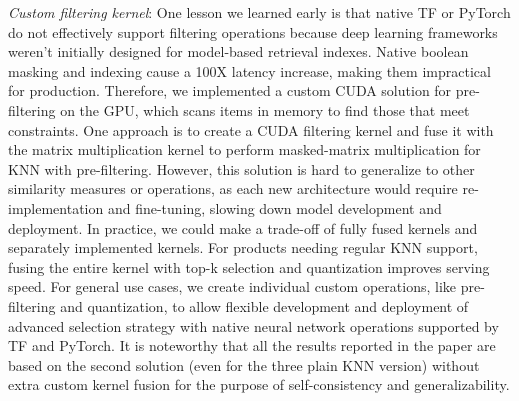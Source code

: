 \textit{Custom filtering kernel}: One lesson we learned early is that native TF or PyTorch do not effectively support filtering operations because deep learning frameworks weren't initially designed for model-based retrieval indexes. Native boolean masking and indexing cause a 100X latency increase, making them impractical for production. Therefore, we implemented a custom CUDA solution for pre-filtering on the GPU, which scans items in memory to find those that meet constraints. One approach is to create a CUDA filtering kernel and fuse it with the matrix multiplication kernel to perform masked-matrix multiplication for KNN with pre-filtering. However, this solution is hard to generalize to other similarity measures or operations, as each new architecture would require re-implementation and fine-tuning, slowing down model development and deployment. 
In practice, we could make a trade-off of fully fused kernels and separately implemented kernels. For products needing regular KNN support, fusing the entire kernel with top-k selection and quantization improves serving speed. For general use cases, we create individual custom operations, like pre-filtering and quantization, to allow flexible development and deployment of advanced selection strategy with native neural network operations supported by TF and PyTorch. It is noteworthy that all the results reported in the paper are based on the second solution (even for the three plain KNN version) without extra custom kernel fusion for the purpose of self-consistency and generalizability.
